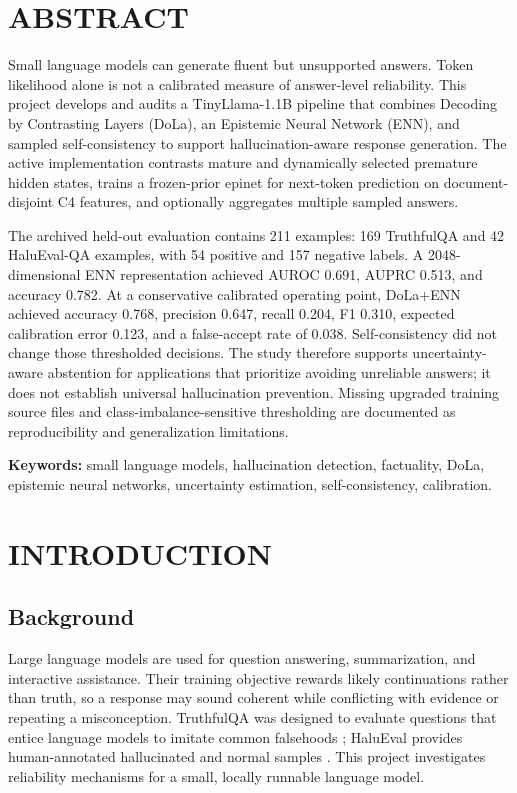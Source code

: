 \documentclass[12pt,a4paper,oneside]{report}
\begin{document}
\chapter*{ABSTRACT}
Small language models can generate fluent but unsupported answers. Token likelihood alone is not a calibrated measure of answer-level reliability. This project develops and audits a TinyLlama-1.1B pipeline that combines Decoding by Contrasting Layers (DoLa), an Epistemic Neural Network (ENN), and sampled self-consistency to support hallucination-aware response generation. The active implementation contrasts mature and dynamically selected premature hidden states, trains a frozen-prior epinet for next-token prediction on document-disjoint C4 features, and optionally aggregates multiple sampled answers.

The archived held-out evaluation contains 211 examples: 169 TruthfulQA and 42 HaluEval-QA examples, with 54 positive and 157 negative labels. A 2048-dimensional ENN representation achieved AUROC 0.691, AUPRC 0.513, and accuracy 0.782. At a conservative calibrated operating point, DoLa+ENN achieved accuracy 0.768, precision 0.647, recall 0.204, F1 0.310, expected calibration error 0.123, and a false-accept rate of 0.038. Self-consistency did not change those thresholded decisions. The study therefore supports uncertainty-aware abstention for applications that prioritize avoiding unreliable answers; it does not establish universal hallucination prevention. Missing upgraded training source files and class-imbalance-sensitive thresholding are documented as reproducibility and generalization limitations.

\noindent\textbf{Keywords:} small language models, hallucination detection, factuality, DoLa, epistemic neural networks, uncertainty estimation, self-consistency, calibration.
\clearpage

\tableofcontents
\listoffigures
\listoftables
\clearpage
{}

\chapter{INTRODUCTION}
\section{Background}
Large language models are used for question answering, summarization, and interactive assistance. Their training objective rewards likely continuations rather than truth, so a response may sound coherent while conflicting with evidence or repeating a misconception. TruthfulQA was designed to evaluate questions that entice language models to imitate common falsehoods \citep{lin2022truthfulqa}; HaluEval provides human-annotated hallucinated and normal samples \citep{li2023halueval}. This project investigates reliability mechanisms for a small, locally runnable language model.
\end{document}
